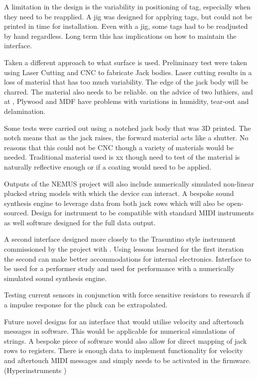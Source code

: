 A limitation in the design is the variability in positioning of tag,
especially when they need to be reapplied. A jig was designed for
applying tags, but could not be printed in time for installation. Even
with a jig, some tags had to be readjusted by hand regardless. Long term
this has implications on how to maintain the interface.

Taken a different approach to what surface is used. Preliminary test
were taken using Laser Cutting and CNC to fabricate Jack bodies. Laser
cutting results in a loss of material that has too much variability. The
edge of the jack body will be charred. The material also needs to be
reliable. on the advice of two luthiers,  and  at , Plywood and MDF have problems with
variations in humidity, tear-out and delamination.

Some tests were carried out using a notched jack body that was 3D
printed. The notch means that as the jack raises, the forward material
acts like a shutter. No reasons that this could not be CNC though a
variety of materials would be needed. Traditional material used is xx
though need to test of the material is naturally reflective enough or if
a coating would need to be applied.

Outputs of the NEMUS project will also include numerically simulated
non-linear plucked string models with which the device can interact. A
bespoke sound synthesis engine to leverage data from both jack rows
which will also be open-sourced. Design for instrument to be compatible
with standard MIDI instruments as well software designed for the full
data output.

A second interface designed more closely to the Trasuntino style
instrument commissioned by the  project with . Using
lessons learned for the first iteration the second can make better
accommodations for internal electronics. Interface to be used for a
performer study and used for performance with a numerically simulated
sound synthesis engine.

Testing current sensors in conjunction with force sensitive resistors to
research if a impulse response for the pluck can be extrapolated.

Future novel designs for an interface that would utilise velocity and
aftertouch messages in software. This would be applicable for numerical
simulations of strings. A bespoke piece of software would also allow
for direct mapping of jack rows to registers. There is enough data to
implement functionality for velocity and aftertouch MIDI messages and
simply needs to be activated in the firmware. (Hyperinstruments
\cite{nime2024_20})

